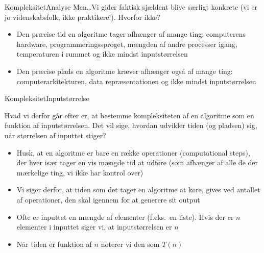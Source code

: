 \documentclass[aspectratio=1610]{beamer}
\begin{document}
\begin{frame}{Kompleksitet}{Analyse}
    Men\ldots Vi gider faktisk sjældent blive særligt konkrete (vi er jo
    videnskabsfolk, ikke praktikere!). Hvorfor ikke?

    \pause
    \begin{itemize}
        \item Den præcise tid en algoritme tager afhænger af mange ting:
            computerens hardware, programmeringssproget, mængden af andre
            processer igang, temperaturen i rummet og ikke mindst
            \alert{inputstørrelsen}
        \item Den præcise plads en algoritme kræver afhænger også af mange ting:
            computerarkitekturen, data repræsentationen og ikke mindst
            \alert{inputstørrelsen}
    \end{itemize}
\end{frame}

\begin{frame}{Kompleksitet}{Inputstørrelse}

    Hvad vi derfor går efter er, at bestemme kompleksiteten af en algoritme som
    \alert{en funktion af inputstørrelsen}. Det vil sige, hvordan udvikler tiden
    (og pladsen) sig, når størrelsen af inputtet stiger?

    \pause
    \begin{itemize}
        \item Husk, at en algoritme er bare en række \alert{operationer}
            (computational steps), der hver især tager en vis mængde tid at
            udføre (som afhænger af alle de der mærkelige ting, vi ikke har
            kontrol over)
        \item Vi siger derfor, at tiden som det tager en algoritme at køre,
            gives ved \alert{antallet af operationer}, den skal igennem for at
            generere sit output
        \item Ofte er inputtet en mængde af elementer (f.eks.\ en liste). Hvis
            der er $n$ elementer i inputtet siger vi, at inputstørrelsen er
            \alert{$n$}
        \item Når tiden er funktion af $n$ noterer vi den som $T(n)$
    \end{itemize}

\end{frame}
\end{document}
